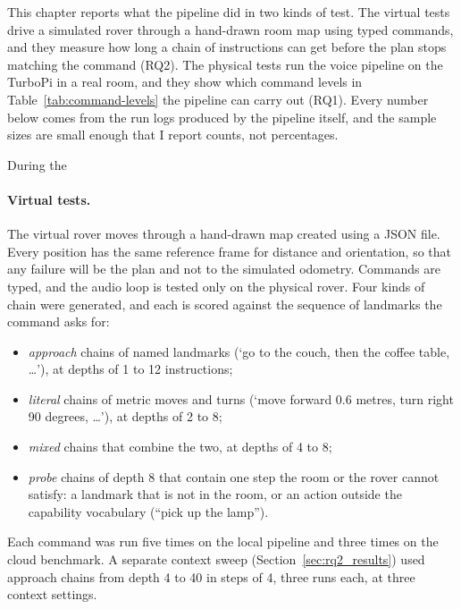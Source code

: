 \label{chap:evaluation}

This chapter reports what the pipeline did in two kinds of test. 
The virtual tests drive a simulated rover through a hand-drawn room map using typed commands, 
and they measure how long a chain of instructions can get before the plan stops
 matching the command (RQ2). The physical tests run the voice pipeline on the TurboPi in a 
 real room, and they show which command levels in Table~\ref{tab:command-levels} the 
 pipeline can carry out (RQ1). Every number below comes from the run logs produced by the
  pipeline itself, and the sample sizes are small enough that I report counts, not percentages.

\label{sec:methodology}

\label{ssec:corpus}

During the \paragraph{Virtual tests.} The virtual rover moves through a hand-drawn map created using a JSON file. 
Every position has the same reference frame for distance and orientation, so that any failure will be the plan and not to the simulated odometry. Commands are 
typed, and the audio loop is tested only on the physical rover. Four kinds of chain were generated, and each 
is scored against the sequence of landmarks the command asks for:
\begin{itemize}
  \item \emph{approach} chains of named landmarks (`go to the couch, then the coffee table, \ldots'), at depths of 1 to 12 instructions;
  \item \emph{literal} chains of metric moves and turns (`move forward 0.6 metres, turn right 90 degrees, \ldots'), at depths of 2 to 8;
  \item \emph{mixed} chains that combine the two, at depths of 4 to 8;
  \item \emph{probe} chains of depth 8 that contain one step the room or the rover 
  cannot satisfy: a landmark that is not in the room, or an action outside 
  the capability vocabulary (``pick up the lamp'').
\end{itemize}
Each command was run five times on the local pipeline and three times on 
the cloud benchmark. A separate context sweep (Section~\ref{sec:rq2_results}) used approach 
chains from depth 4 to 40 in steps of 4, three runs each, at three context settings.

